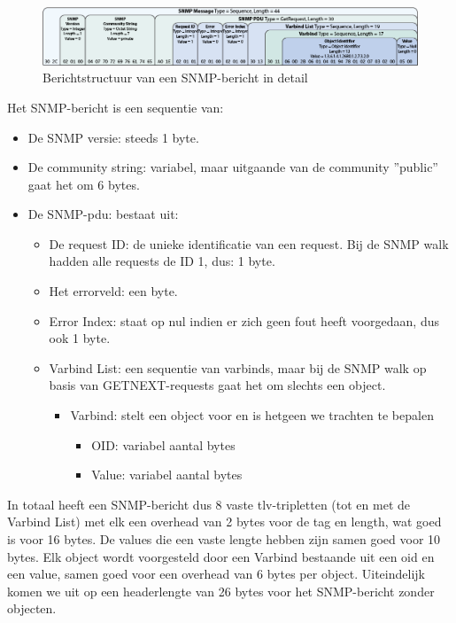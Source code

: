 \begin{figure}[h]
	\centering
	\includegraphics[scale=0.40]{figures/snmp/berichtstructuur-3}
	\caption[Berichtstructuur van een SNMP-bericht in detail]{Berichtstructuur van een SNMP-bericht in detail\cite{snmp-message-format}}
	\label{fig-berichtstructuur-4}
\end{figure}

Het SNMP-bericht is een sequentie van:

\begin{itemize}
	\item De SNMP versie: steeds 1 byte.
	\item De community string: variabel, maar uitgaande van de community ''public'' gaat het om 6 bytes.
	\item De SNMP-\gls{pdu}: bestaat uit:
		\begin{itemize}
			\item De request ID: de unieke identificatie van een request.
				Bij de SNMP walk hadden alle requests de ID 1, dus: 1 byte.
			\item Het errorveld: een byte.
			\item Error Index: staat op nul indien er zich geen fout heeft voorgedaan, dus ook 1 byte.
			\item Varbind List: een sequentie van varbinds, maar bij de SNMP walk op basis van GETNEXT-requests gaat het om slechts een object.
				\begin{itemize}
					\item Varbind: stelt een object voor en is hetgeen we trachten te bepalen
						\begin{itemize}
							\item OID: variabel aantal bytes
							\item Value: variabel aantal bytes
						\end{itemize}
				\end{itemize}
		\end{itemize}
\end{itemize}

In totaal heeft een SNMP-bericht dus 8 vaste \gls{tlv}-tripletten (tot en met de Varbind List) met elk een overhead van 2 bytes voor de tag en length,
wat goed is voor 16 bytes.
De values die een vaste lengte hebben zijn samen goed voor 10 bytes.
Elk object wordt voorgesteld door een Varbind bestaande uit een \gls{oid} en een value, samen goed voor een overhead van 6 bytes per object.
Uiteindelijk komen we uit op een headerlengte van 26 bytes voor het SNMP-bericht zonder objecten.

